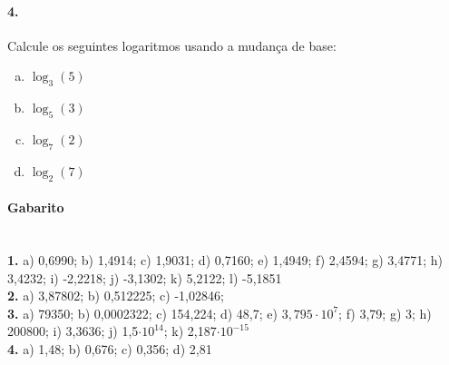 \documentclass[a4paper,12pt]{article}
\begin{document}
\begin{multicols}{2}
\paragraph*{4.} Calcule os seguintes logaritmos usando a mudança de base:

\begin{enumerate}[a)]
    \item $\log_{3}(5)$
    \item $\log_{5}(3)$
    \item $\log_{7}(2)$
    \item $\log_{2}(7)$ 
\end{enumerate}
\end{multicols}


\vspace*{\fill}
{\footnotesize
\paragraph*{Gabarito} \hspace*{\fill}\\
\textbf{1.}  a) 0,6990; b) 1,4914; c) 1,9031; d) 0,7160; e) 1,4949; f) 2,4594; g) 3,4771; h) 3,4232; i) -2,2218; j) -3,1302; k) 5,2122; l) -5,1851\\
\textbf{2.} a) 3,87802; 
b) 0,512225;
c) -1,02846;
\\
\textbf{3.} a) 79350; b) 0,0002322; c) 154,224; d) 48,7; e) $3,795\cdot 10^{7}$; f) 3,79; g) 3; h) 200800; i) 3,3636; j) 1,5$\cdot 10^{14}$; k) 2,187$\cdot 10^{-15}$\\
\textbf{4.} a) 1,48; b) 0,676; c) 0,356; d) 2,81
}
\end{document}

